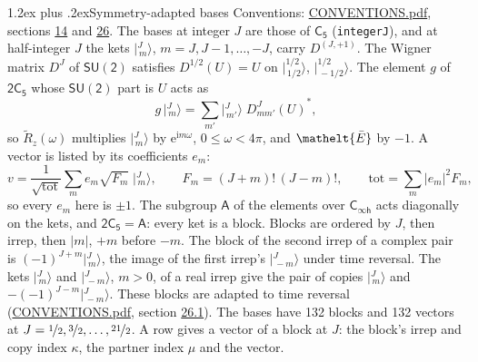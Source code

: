 \documentclass[10pt,a4paper]{article}
\makeatletter
\renewcommand\section{\@startsection{section}{1}{\z@}{-3ex plus -1ex minus -.2ex}%
  {1.2ex plus .2ex}{\normalfont\large\sffamily\bfseries\color{parttitle}}}
\numberwithin{equation}{section}
\newcommand{\eltfont}[1]{{\let\sigma\eltsigma\mathelt{#1}}}
\newcommand{\grp}[1]{\mathsf{#1}}
\newcommand{\elt}[1]{\eltfont{#1}}
\newcommand{\iunit}{\mathrm{i}}
\newcommand{\expe}{\mathrm{e}}
\newcommand{\irrJp}[2]{D^{(#1,#2)}}
\newcommand{\wignerD}[1]{D^{#1}}
\newcommand{\conj}[1]{{#1}^{*}}
\newcommand{\mult}{\kappa}
\newcommand{\intx}{\mu}
\newcommand{\jm}[2]{\bigl\lvert{}^{#1}_{\,#2}\bigr\rangle}
\newcommand{\barred}[1]{\bar{#1}}
\newcommand{\lift}[1]{\tilde{#1}}
\makeatother
\begin{document}
\section{Symmetry-adapted bases}\label{s:bases}
Conventions: \href{../../CONVENTIONS.pdf}{CONVENTIONS.pdf}, sections \href{../../../rotation/CONVENTIONS.pdf\#conv.14}{14} and \href{../../CONVENTIONS.pdf\#conv.26}{26}.
\leavevmode\label{n:index.m}\label{n:vector.ket}The bases at integer $J$ are those of \href{../../../rotation/data/pdf/C5.pdf}{$\grp{C_{5}}$} (\texttt{integerJ}), and at half-integer $J$ the kets $\jm{J}{m}$, $m = J, J-1, \dots, -J$, carry $\irrJp{J}{+1}$. \label{n:matrix.wigner}The Wigner matrix $\wignerD{J}$ of $\grp{SU(2)}$ satisfies $\wignerD{1/2}(U) = U$ on $\jm{1/2}{1/2}$, $\jm{1/2}{-1/2}$. The element $g$ of $\grp{2C_{5}}$ whose $\grp{SU(2)}$ part is $U$ acts as
\begin{equation}\label{e:action}g\,\jm{J}{m} = \sum_{m'} \jm{J}{m'}\; \conj{\wignerD{J}_{m m'}(U)},\end{equation}
so $\lift{R}_{z}(\omega)$ multiplies $\jm{J}{m}$ by $\expe^{\iunit m\omega}$, $0 \le \omega < 4\pi$, and $\elt{\barred{E}}$ by $-1$. \label{n:index.ketcoefficient}\label{n:vector.basis.symmetry}\label{n:index.ketweight}\label{n:index.total}A vector is listed by its coefficients $e_m$:
\begin{equation}\label{e:ket}v = \frac{1}{\sqrt{\mathrm{tot}}}\sum_m e_m\sqrt{F_m}\;\jm{J}{m},\qquad F_m = (J+m)!\,(J-m)!,\qquad \mathrm{tot} = \sum_m |e_m|^2F_m,\end{equation}
so every $e_m$ here is $\pm 1$.
\leavevmode\label{n:group.A}The subgroup $\grp{A}$ of the elements over $\grp{C_{\infty h}}$ acts diagonally on the kets, and $\grp{2C_{5}} = \grp{A}$: every ket is a block. Blocks are ordered by $J$, then irrep, then $|m|$, $+m$ before $-m$. The block of the second irrep of a complex pair is $(-1)^{J+m}\jm{J}{m}$, the image of the first irrep's $\jm{J}{-m}$ under time reversal. The kets $\jm{J}{m}$ and $\jm{J}{-m}$, $m > 0$, of a real irrep give the pair of copies $\jm{J}{m}$ and $-(-1)^{J-m}\jm{J}{-m}$. These blocks are adapted to time reversal (\href{../../CONVENTIONS.pdf}{CONVENTIONS.pdf}, section \href{../../CONVENTIONS.pdf\#conv.26.1}{26.1}).
The bases have 132 blocks and 132 vectors at $J = \nicefrac{1}{2}, \nicefrac{3}{2}, \dots, \nicefrac{21}{2}$. \label{n:index.copy}\label{n:head.vector}A row gives a vector of a block at $J$: the block's irrep and copy index $\mult$, the partner index $\intx$ and the vector.
\end{document}

